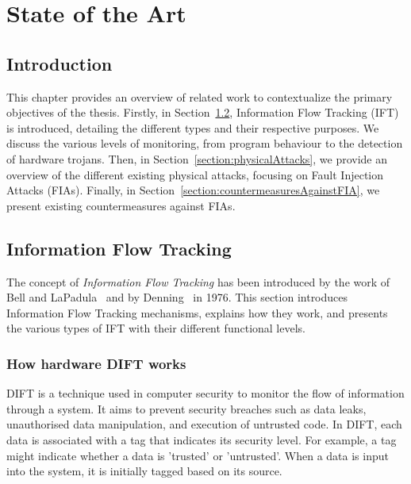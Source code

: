 \chapter{State of the Art}
\label{chapter:soa}
\minitoc

\section{Introduction}
This chapter provides an overview of related work to contextualize the primary objectives of the thesis. Firstly, in Section~\ref{section:ift}, Information Flow Tracking (IFT) is introduced, detailing the different types and their respective purposes. We discuss the various levels of monitoring, from program behaviour to the detection of hardware trojans.
Then, in Section~\ref{section:physicalAttacks}, we provide an overview of the different existing physical attacks, focusing on Fault Injection Attacks (FIAs).
Finally, in Section~\ref{section:countermeasuresAgainstFIA}, we present existing countermeasures against FIAs.

\section{Information Flow Tracking}
\label{section:ift}
The concept of \textit{Information Flow Tracking} has been introduced by the work of Bell and LaPadula~\cite{BLP-76-military} and by Denning~\cite{D-76-commacm} in 1976.
This section introduces Information Flow Tracking mechanisms, explains how they work, and presents the various types of IFT with their different functional levels.

\subsection{How hardware DIFT works}
DIFT is a technique used in computer security to monitor the flow of information through a system. It aims to prevent security breaches such as data leaks, unauthorised data manipulation, and execution of untrusted code. In DIFT, each data is associated with a tag that indicates its security level.
For example, a tag might indicate whether a data is 'trusted' or 'untrusted'. When a data is input into the system, it is initially tagged based on its source.

